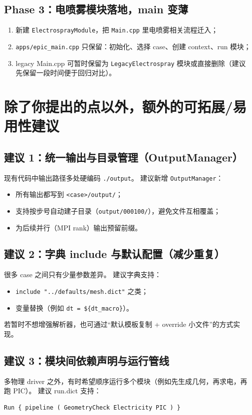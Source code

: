 \documentclass[UTF8,a4paper,11pt]{ctexart}
\begin{document}
\subsection{Phase 3：电喷雾模块落地，main 变薄}
\begin{enumerate}[label=\arabic*)]
  \item 新建 \texttt{ElectrosprayModule}，把 \texttt{Main.cpp} 里电喷雾相关流程迁入；
  \item \texttt{apps/epic\_main.cpp} 只保留：初始化、选择 case、创建 context、run 模块；
  \item legacy Main.cpp 可暂时保留为 \texttt{LegacyElectrospray} 模块或直接删除（建议先保留一段时间便于回归对比）。
\end{enumerate}

\section{除了你提出的点以外，额外的可拓展/易用性建议}

\subsection{建议 1：统一输出与目录管理（OutputManager）}
现有代码中输出路径多处硬编码 \texttt{./output}。
建议新增 \texttt{OutputManager}：
\begin{itemize}
  \item 所有输出都写到 \texttt{<case>/output/}；
  \item 支持按步号自动建子目录（\texttt{output/000100/}），避免文件互相覆盖；
  \item 为后续并行（MPI rank）输出预留前缀。
\end{itemize}

\subsection{建议 2：字典 include 与默认配置（减少重复）}
很多 case 之间只有少量参数差异。
建议字典支持：
\begin{itemize}
  \item \texttt{include "../defaults/mesh.dict"} 之类；
  \item 变量替换（例如 \texttt{dt = \$\{dt\_macro\}}）。
\end{itemize}

若暂时不想增强解析器，也可通过“默认模板复制 + override 小文件”的方式实现。

\subsection{建议 3：模块间依赖声明与运行管线}
多物理 driver 之外，有时希望顺序运行多个模块（例如先生成几何，再求电，再跑 PIC）。
建议 run.dict 支持：
\begin{lstlisting}
Run { pipeline ( GeometryCheck Electricity PIC ) }
\end{lstlisting}
\end{document}
